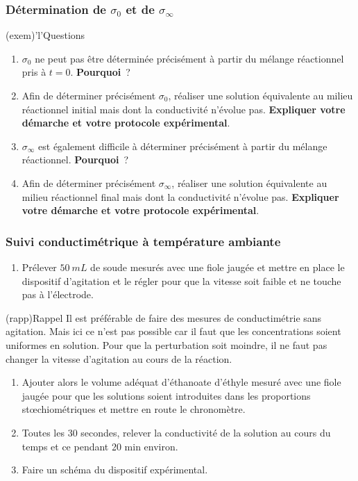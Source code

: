 \documentclass[../main/main.tex]{subfiles}
\begin{document}
\subsubsection{Détermination de $\sigma_0$ et de $\sigma_\infty$}
\begin{tcb}(exem)'l'{Questions}
	\vspace{-10pt}
	\begin{enumerate}[label=\sqenumi, start=13]
		\item $\sigma_0$ ne peut pas être déterminée précisément à partir du mélange
		      réactionnel pris à $t = 0$. \textbf{Pourquoi}~?
		\item Afin de déterminer précisément $\sigma_0$, réaliser une solution
		      équivalente au milieu réactionnel initial mais dont la conductivité
		      n'évolue pas. \textbf{Expliquer votre démarche et votre protocole
			      expérimental}.
		\item $\sigma_\infty$ est également difficile à déterminer précisément à
		      partir du mélange réactionnel. \textbf{Pourquoi}~?
		\item Afin de déterminer précisément $\sigma_\infty$, réaliser une solution
		      équivalente au milieu réactionnel final mais dont la conductivité
		      n'évolue pas. \textbf{Expliquer votre démarche et votre protocole
			      expérimental}.
	\end{enumerate}
\end{tcb}
\vspace{-10pt}

\subsubsection{Suivi conductimétrique à température ambiante}

\begin{enumerate}
	\item Prélever $\SI{50}{mL}$ de soude mesurés avec une fiole jaugée et
	      mettre en place le dispositif d'agitation et le  régler pour que la
	      vitesse soit faible et ne touche pas à l'électrode.
\end{enumerate}
\vspace{-10pt}
\begin{tcb}(rapp){Rappel}
	\centering
	Il est préférable de faire des mesures de conductimétrie sans
	agitation. Mais ici ce n'est pas possible car il faut que les
	concentrations soient uniformes en solution. Pour que la
	perturbation soit moindre, il ne faut pas changer la vitesse
	d'agitation au cours de la réaction.
\end{tcb}
\vspace{-10pt}
\begin{enumerate}[resume]
	\item Ajouter alors le volume adéquat d'éthanoate d'éthyle mesuré avec une
	      fiole jaugée pour que les solutions soient introduites dans les
	      proportions stœchiométriques et mettre en route le chronomètre.
	\item Toutes les 30 secondes, relever la conductivité de la solution au
	      cours du temps et ce pendant 20 min environ.
	\item Faire un schéma du dispositif expérimental.
\end{enumerate}
\end{document}
